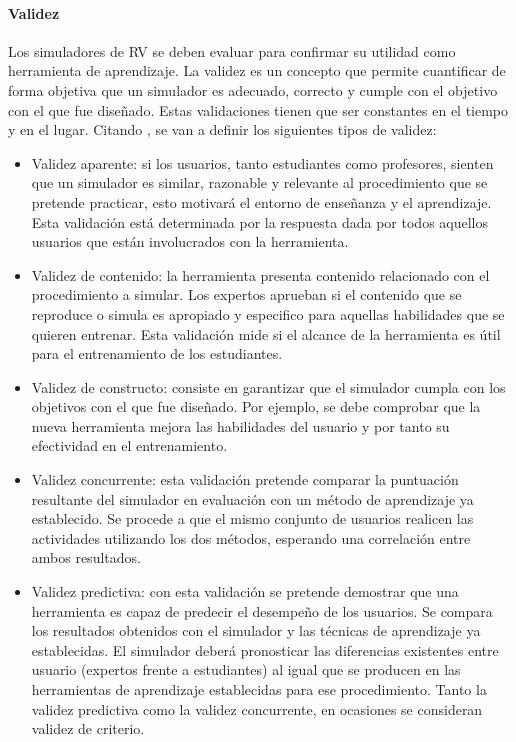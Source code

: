 \paragraph{Validez}

Los simuladores de \ac{RV} se deben evaluar para confirmar su utilidad como herramienta de aprendizaje. La validez es un concepto que permite cuantificar de forma objetiva que un simulador es adecuado, correcto y cumple con el objetivo con el que fue diseñado.
Estas validaciones tienen que ser constantes en el tiempo y en el lugar. Citando \cite{pales2010uso}, se van a definir los siguientes tipos de validez:
\begin{itemize}
    \item Validez aparente:
    si los usuarios, tanto estudiantes como profesores, sienten que un simulador es similar, razonable y relevante al procedimiento que se pretende practicar, esto motivará el entorno de enseñanza y el aprendizaje. Esta validación está determinada por la respuesta dada por todos aquellos usuarios que están involucrados con la herramienta.
    
    \item Validez de contenido: la herramienta presenta contenido relacionado con el procedimiento a simular. Los expertos aprueban si el contenido que se reproduce o simula%
    es apropiado y especifico para aquellas habilidades que se quieren entrenar.
    Esta validación mide si el alcance de la herramienta es útil para el entrenamiento de los estudiantes.
    
    \item Validez de constructo:
    consiste en garantizar que el simulador cumpla con los objetivos con el que fue diseñado. Por ejemplo, se debe comprobar que la nueva herramienta mejora las habilidades del usuario y por tanto su efectividad en el entrenamiento. 
    
    \item Validez concurrente:
    esta validación pretende comparar la puntuación resultante del simulador en evaluación con un método de aprendizaje ya establecido. Se procede a que el mismo conjunto de usuarios realicen las actividades utilizando los dos métodos, esperando una correlación entre ambos resultados.

    \item Validez predictiva:
    con esta validación se pretende demostrar que una herramienta es capaz de predecir el desempeño de los usuarios. Se compara los resultados obtenidos con el simulador y las técnicas de aprendizaje ya establecidas. El simulador deberá pronosticar las diferencias existentes entre usuario (expertos frente a estudiantes) al igual que se producen en las herramientas de aprendizaje establecidas para ese procedimiento.  Tanto la validez predictiva como la validez concurrente, en ocasiones se consideran validez de criterio. 
    

\end{itemize}
